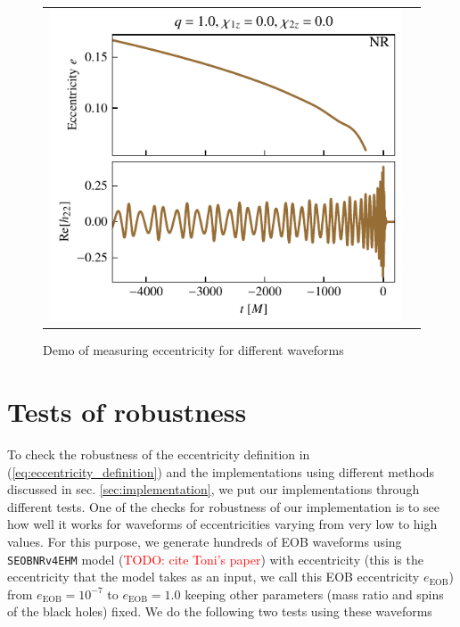 \documentclass[aps,prd,amsmath,floats,floatfix, twocolumn,
superscriptaddress,nofootinbib,showpacs]{revtex4-1}
\newcommand{\red}{\textcolor{red}}
\newcommand{\TODO}[1]{\red{TODO: #1}}
\newcommand{\eEOB}{e_{\text{EOB}}}
\begin{document}
\begin{figure}[htb]
\begin{tabular}{cc}
     \includegraphics[width=\columnwidth]{demo_NR} &
  \end{tabular}
  \caption{Demo of measuring eccentricity for different waveforms}
  \label{fig:demonstrations}
\end{figure}



\section{Tests of robustness}
\label{sec:tests}
To check the robustness of the eccentricity definition in
(\ref{eq:eccentricity_definition}) and the implementations using
different methods discussed in sec. \ref{sec:implementation}, we put
our implementations through different tests. One of the checks for
robustness of our implementation is to see how well it works for
waveforms of eccentricities varying from very low to high values. For
this purpose, we generate hundreds of EOB waveforms using
\texttt{SEOBNRv4EHM} model (\TODO{cite Toni's paper}) with
eccentricity (this is the eccentricity that the model takes as an
input, we call this EOB eccentricity $\eEOB$) from
$\eEOB = 10^{-7}$ to $\eEOB = 1.0$ keeping other
parameters (mass ratio and spins of the black holes) fixed. We do the
following two tests using these waveforms
\end{document}
